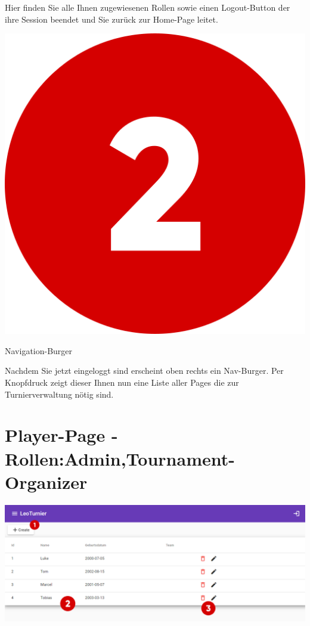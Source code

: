 Hier finden Sie alle Ihnen zugewiesenen Rollen sowie einen Logout-Button der ihre Session beendet und Sie zurück zur Home-Page leitet.
\bigskip

\includegraphics[scale=0.05]{pics/user-guide/numbers/number-2.png} \begin{LARGE} Navigation-Burger \end{LARGE}

Nachdem Sie jetzt eingeloggt sind erscheint oben rechts ein Nav-Burger. Per Knopfdruck zeigt dieser Ihnen nun eine Liste aller Pages die zur
Turnierverwaltung nötig sind.

\newpage
\section{Player-Page - Rollen:Admin,Tournament-Organizer}
\includegraphics[scale=0.425]{pics/user-guide/player-overview-page.PNG}
\bigskip

